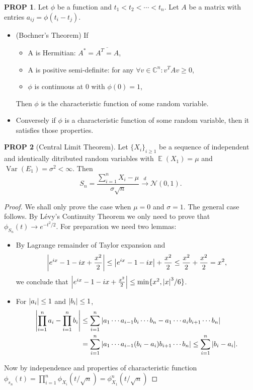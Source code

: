 \documentclass[hidelinks,11pt]{article}
\theoremstyle{definition}
\theoremstyle{dotles}
\theoremstyle{dotless}
\newtheorem{prop}{PROP}[section]
\theoremstyle{remark}
\DeclareMathOperator{\Var}{Var}
\DeclareMathOperator{\E}{\mathbb{E}}
\begin{document}
\begin{prop}
Let $\phi$ be a function and $t_1<t_2<\cdots<t_n$. Let $A$ be a matrix with entries $a_{ij}=\phi(t_i-t_j)$.\begin{itemize}
    \item \textup{(Bochner's Theorem)} If\begin{itemize}
        \item A is Hermitian: $A^*=\overline{A^T=A}$,
        \item A is positive semi-definite: for any $\forall v\in\mathbb{C}^n:v^TAv\geq0$,
        \item $\phi$ is continuous at 0 with $\phi(0)=1$,
    \end{itemize}
    Then $\phi$ is the characteristic function of some random variable.
    \item Conversely if $\phi$ is a characteristic function of some random variable, then it satisfies those properties.
\end{itemize}
\end{prop}

\begin{prop}[Central Limit Theorem]
Let $\{X_i\}_{i\geq1}$ be a sequence of independent and identically ditributed random variables with $\E(X_1)=\mu$ and $\Var(E_1)=\sigma^2<\infty$. Then
\[S_n=\frac{\sum_{i=1}^nX_i-\mu}{\sigma\sqrt{n}}\xrightarrow{d}\mathcal{N}(0,1).\]
\end{prop}
\begin{proof}
We shall only prove the case when $\mu=0$ and $\sigma=1$. The general case follows. By Lévy's Continuity Theorem we only need to prove that $\phi_{S_n}(t)\to e^{-t^2/2}$. For preparation we need two lemmas:\begin{itemize}
    \item By Lagrange remainder of Taylor expansion and
    \[\abs{e^{ix}-1-ix+\frac{x^2}{2}}\leq\abs{e^{ix}-1-ix}+\frac{x^2}{2}\leq\frac{x^2}{2}+\frac{x^2}{2}=x^2,\]
    we conclude that $\abs{e^{ix}-1-ix+\frac{x^2}{2}}\leq\min\{x^2,\abs{x}^3/6\}$.
    \item For $\abs{a_i}\leq1$ and $\abs{b_i}\leq1$,
    \begin{align*}
    \abs{\prod_{i=1}^na_i-\prod_{i=1}^nb_i}&\leq\sum_{i=1}^n\abs{a_1\cdots a_{i-1}b_i\cdots b_n-a_1\cdots a_ib_{i+1}\cdots b_n}\\
    &=\sum_{i=1}^n\abs{a_1\cdots a_{i-1}(b_i-a_i)b_{i+1}\cdots b_n}\leq\sum_{i=1}^n\abs{b_i-a_i}.
    \end{align*}
\end{itemize}
Now by independence and properties of characteristic function $\phi_{s_n}(t)=\prod_{i=1}^n\phi_{X_i}(t/\sqrt{n})=\phi_{X_1}^n(t/\sqrt{n})$
\end{proof}
\end{document}
